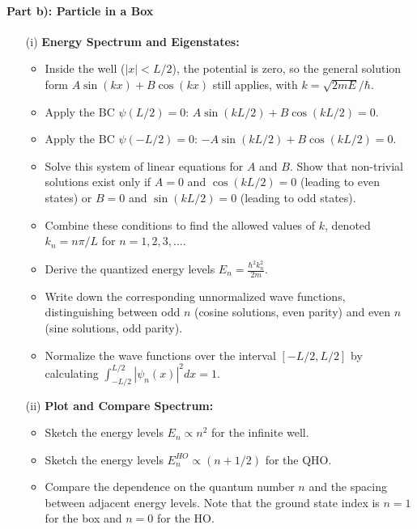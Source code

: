 \documentclass[10pt]{article}
\begin{document}
\paragraph{Part b): Particle in a Box}
\begin{enumerate}
    \item[(i)] \textbf{Energy Spectrum and Eigenstates:}
        \begin{itemize}
            \item Inside the well (\(|x| < L/2\)), the potential is zero, so the general solution form \(A\sin(kx) + B\cos(kx)\) still applies, with \(k=\sqrt{2mE}/\hbar\).
            \item Apply the BC \(\psi(L/2)=0\): \(A\sin(kL/2) + B\cos(kL/2) = 0\).
            \item Apply the BC \(\psi(-L/2)=0\): \(-A\sin(kL/2) + B\cos(kL/2) = 0\).
            \item Solve this system of linear equations for \(A\) and \(B\). Show that non-trivial solutions exist only if \(A=0\) and \(\cos(kL/2)=0\) (leading to even states) or \(B=0\) and \(\sin(kL/2)=0\) (leading to odd states).
            \item Combine these conditions to find the allowed values of \(k\), denoted \(k_n = n\pi/L\) for \(n=1, 2, 3, \dots\).
            \item Derive the quantized energy levels \(E_n = \frac{\hbar^2 k_n^2}{2m}\).
            \item Write down the corresponding unnormalized wave functions, distinguishing between odd \(n\) (cosine solutions, even parity) and even \(n\) (sine solutions, odd parity).
            \item Normalize the wave functions over the interval \([-L/2, L/2]\) by calculating \(\int_{-L/2}^{L/2} |\psi_n(x)|^2 dx = 1\).
        \end{itemize}
    \item[(ii)] \textbf{Plot and Compare Spectrum:}
        \begin{itemize}
            \item Sketch the energy levels \(E_n \propto n^2\) for the infinite well.
            \item Sketch the energy levels \(E_n^{HO} \propto (n+1/2)\) for the QHO.
            \item Compare the dependence on the quantum number \(n\) and the spacing between adjacent energy levels. Note that the ground state index is \(n=1\) for the box and \(n=0\) for the HO.
        \end{itemize}

\end{enumerate}
\end{document}
